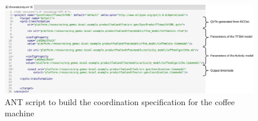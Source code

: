   \begin{figure}[h]
  	\begin{center}
  		\includegraphics[width=1\textwidth]{bcool/figs/antbcool.pdf}
  		\caption{ANT script to build the coordination specification for the coffee machine}
  		\label{fig:screenantbcool}
  	\end{center}
  \end{figure}

